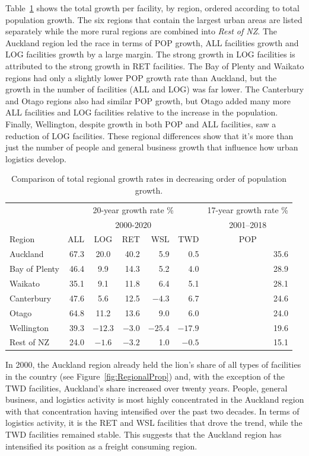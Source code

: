 \documentclass[3p, a4paper, authoryear, 11pt, fleqn, review]{elsarticle}
\begin{document}
Table~\ref{tab:regionalGrowth} shows the total growth per facility, by region, ordered according to total population growth. The six regions that contain the largest urban areas are listed separately while the more rural regions are combined into \emph{Rest of NZ}. The Auckland region led the race in terms of POP growth, ALL facilities growth and LOG facilities growth by a large margin. The strong growth in LOG facilities is attributed to the strong growth in RET facilities. The Bay of Plenty and Waikato regions had only a slightly lower POP growth rate than Auckland, but the growth in the number of facilities (ALL and LOG) was far lower. The Canterbury and Otago regions also had similar POP growth, but Otago added many more ALL facilities and LOG facilities relative to the increase in the population. Finally, Wellington, despite growth in both POP and ALL facilities, saw a reduction of LOG facilities. These regional differences show that it's more than just the number of people and general business growth that influence how urban logistics develop. 



\begin{table}[h!]
    \centering
    \caption{Comparison of total regional growth rates in decreasing order of population growth.}\label{tab:regionalGrowth}
    \begin{tabular}{l r c r r r | r }
    \toprule
    &\multicolumn{5}{c|}{20-year growth rate \%}&\multicolumn{1}{c}{17-year growth rate \% }\\
    &\multicolumn{5}{c|}{2000-2020}&\multicolumn{1}{c}{2001--2018}\\
    Region & ALL &LOG& RET & WSL & TWD & \multicolumn{1}{c}{POP} \\
    \midrule
    Auckland&67.3&20.0&40.2&5.9&0.5&35.6\\
    Bay of Plenty&46.4&9.9&14.3&5.2&4.0&28.9\\
    Waikato&35.1&9.1&11.8&6.4&5.1&28.1\\
    Canterbury&47.6&5.6&12.5&$-4.3$&6.7&24.6\\
    Otago&64.8&11.2&13.6&9.0&6.0&24.0\\
    Wellington&39.3&$-12.3$&$-3.0$&$-25.4$&$-17.9$&19.6\\
    Rest of NZ&24.0&$-1.6$&$-3.2$&1.0&$-0.5$&15.1\\
    \bottomrule
    \end{tabular}
\end{table}

In 2000, the Auckland region already held the lion's share of all types of facilities in the country (see Figure~\ref{fig:RegionalProp}) and, with the exception of the TWD facilities, Auckland's share increased over twenty years. People, general business, and logistics activity is most highly concentrated in the Auckland region with that concentration having intensified over the past two decades. In terms of logistics activity, it is the RET and WSL facilities that drove the trend, while the TWD facilities remained stable. This suggests that the Auckland region has intensified its position as a freight consuming region.
\end{document}
